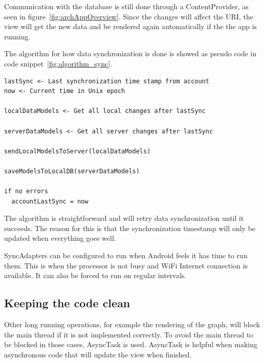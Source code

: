
Communication with the database is still done through a ContentProvider, as seen in figure~\ref{fig:archAppOverview}. Since the changes will affect the URI, the view will get the new data and be rendered again automatically if the the app is running.

The algorithm for how data synchronization is done is showed as pseudo code in code snippet~\ref{fig:algorithm_sync}.\\


\noindent\begin{minipage}{\textwidth}
\begin{lstlisting}[caption={Algorithm for the synchronization flow}, label={fig:algorithm_sync}]
lastSync <- Last synchronization time stamp from account
now <- Current time in Unix epoch

localDataModels <- Get all local changes after lastSync

serverDataModels <- Get all server changes after lastSync

sendLocalModelsToServer(localDataModels)

saveModelsToLocalDB(serverDataModels)

if no errors
  accountLastSync = now
\end{lstlisting}
\end{minipage}

The algorithm is straightforward and will retry data synchronization until it succeeds. The reason for this is that the synchronization timestamp will only be updated when everything goes well. 


SyncAdapters can be configured to run when Android feels it has time to run them. This is when the processor is not busy and WiFi Internet connection is available. It can also be forced to run on regular intervals.

\subsection{Keeping the code clean}
Other long running operations, for example the rendering of the graph, will block the main thread if it is not implemented correctly. To avoid the main thread to be blocked in those cases, AsyncTask is used. AsyncTask is helpful when making asynchronous code that will update the view when finished.

